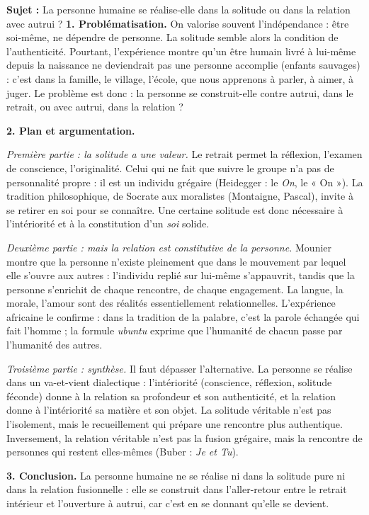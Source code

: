 \documentclass[11pt]{article}
\begin{document}
\begin{exoresolu}
\textbf{Sujet :} La personne humaine se réalise-elle dans la solitude ou dans la relation avec autrui ?
\tcblower
\textbf{1. Problématisation.} On valorise souvent l'indépendance : être soi-même, ne dépendre de personne. La solitude semble alors la condition de l'authenticité. Pourtant, l'expérience montre qu'un être humain livré à lui-même depuis la naissance ne deviendrait pas une personne accomplie (enfants sauvages) : c'est dans la famille, le village, l'école, que nous apprenons à parler, à aimer, à juger. Le problème est donc : la personne se construit-elle contre autrui, dans le retrait, ou avec autrui, dans la relation ?

\textbf{2. Plan et argumentation.}

\emph{Première partie : la solitude a une valeur.} Le retrait permet la réflexion, l'examen de conscience, l'originalité. Celui qui ne fait que suivre le groupe n'a pas de personnalité propre : il est un individu grégaire (Heidegger : le \emph{On}, le « On »). La tradition philosophique, de Socrate aux moralistes (Montaigne, Pascal), invite à se retirer en soi pour se connaître. Une certaine solitude est donc nécessaire à l'intériorité et à la constitution d'un \emph{soi} solide.

\emph{Deuxième partie : mais la relation est constitutive de la personne.} Mounier montre que la personne n'existe pleinement que dans le mouvement par lequel elle s'ouvre aux autres : l'individu replié sur lui-même s'appauvrit, tandis que la personne s'enrichit de chaque rencontre, de chaque engagement. La langue, la morale, l'amour sont des réalités essentiellement relationnelles. L'expérience africaine le confirme : dans la tradition de la palabre, c'est la parole échangée qui fait l'homme ; la formule \emph{ubuntu} exprime que l'humanité de chacun passe par l'humanité des autres.

\emph{Troisième partie : synthèse.} Il faut dépasser l'alternative. La personne se réalise dans un va-et-vient dialectique : l'intériorité (conscience, réflexion, solitude féconde) donne à la relation sa profondeur et son authenticité, et la relation donne à l'intériorité sa matière et son objet. La solitude véritable n'est pas l'isolement, mais le recueillement qui prépare une rencontre plus authentique. Inversement, la relation véritable n'est pas la fusion grégaire, mais la rencontre de personnes qui restent elles-mêmes (Buber : \emph{Je et Tu}).

\textbf{3. Conclusion.} La personne humaine ne se réalise ni dans la solitude pure ni dans la relation fusionnelle : elle se construit dans l'aller-retour entre le retrait intérieur et l'ouverture à autrui, car c'est en se donnant qu'elle se devient.
\end{exoresolu}
\end{document}

